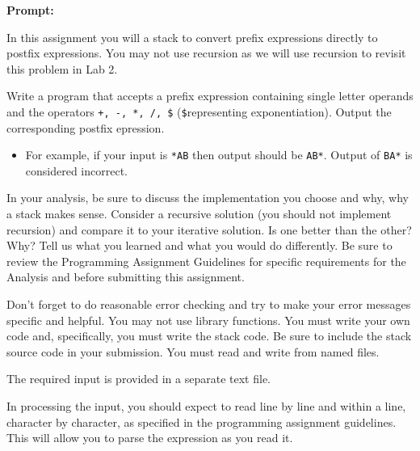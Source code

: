 \documentclass[10pt,letterpaper,final]{report}
\begin{document}
\vline

\medskip

\noindent\textbf{Prompt:}

In this assignment you will a stack to convert prefix expressions directly to postfix expressions. You may not use recursion as we will use recursion to revisit this problem in Lab 2.


Write a program that accepts a prefix expression containing single letter operands and the operators \verb|+, -, *, /, $| (\verb|$|representing exponentiation). Output the corresponding postfix epression.

\begin{itemize}
  \item For example, if your input is \verb|*AB| then output should be \verb|AB*|. Output of \verb|BA*| is considered incorrect.
\end{itemize}

In your analysis, be sure to discuss the implementation you choose and why, why a stack makes sense. Consider a recursive solution (you should not implement recursion) and compare it to your iterative solution. Is one better than the other? Why? Tell us what you learned and what you would do differently. Be sure to review the Programming Assignment Guidelines for specific requirements for the Analysis and before submitting this assignment.

Don't forget to do reasonable error checking and try to make your error messages specific and helpful.  You may not use library functions. You must write your own code and, specifically, you must write the stack code. Be sure to include the stack source code in your submission. You must read and write from named files.

The required input is provided in a separate text file.

In processing the input, you should expect to read line by line and within a line, character by character, as specified in the programming assignment guidelines. This will allow you to parse the expression as you read it.
\end{document}
